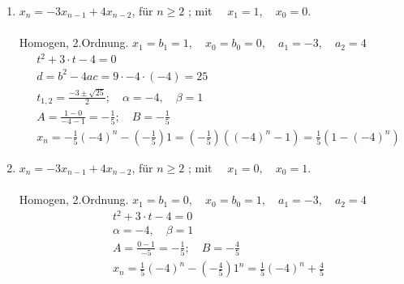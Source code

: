 \begin{enumerate}[label=(\alph*)]
		\item $x_n = -3x_{n-1} +4x_{n-2}$, f\"ur $n \geq 2 $ ; mit $\quad x_1 = 1, \quad x_0 =0 .$ \\ \\
		Homogen, 2.Ordnung.
	    $x_1 =b_1 = 1, \quad x_0=b_0=0, \quad a_1=-3, \quad a_2=4$\\
	  	\begin{align*}
			&t^2+3 \cdot t -4 =0 \\
			&d=b^2-4ac= 9 \cdot -4 \cdot (-4) = 25 \\
			&t_{1,2}= \frac{-3 \pm \sqrt{25}}{2}; \quad \alpha = -4, \quad \beta =1 \\
			&A= \frac{1-0}{-4-1} = -\frac{1}{5}; \quad B=-\frac{1}{5}\\
			&x_n=-\frac{1}{5}(-4)^n - (-\frac{1}{5})1=(- \frac{1}{5})((-4)^n-1)=\frac{1}{5}(1-(-4)^n)
		\end{align*}
 		
 		\item $x_n = -3x_{n-1} +4x_{n-2}$, f\"ur $n \geq 2 $ ; mit $\quad x_1 = 0, \quad x_0 =1 .$ \\ \\
   		Homogen, 2.Ordnung.
	    $x_1 =b_1 = 0, \quad x_0=b_0=1, \quad a_1=-3, \quad a_2=4$\\
	    \begin{align*}
	   		&t^2+3 \cdot t -4 =0 \\
	   	    &\alpha = -4, \quad \beta =1 \\
	   	    &A= \frac{0-1}{-5} = -\frac{1}{5}; \quad B=-\frac{4}{5}\\
	   	    &x_n=\frac{1}{5}(-4)^n - (-\frac{4}{5})1^n=\frac{1}{5}(-4)^n+\frac{4}{5}
	   	\end{align*}
    \end{enumerate}







